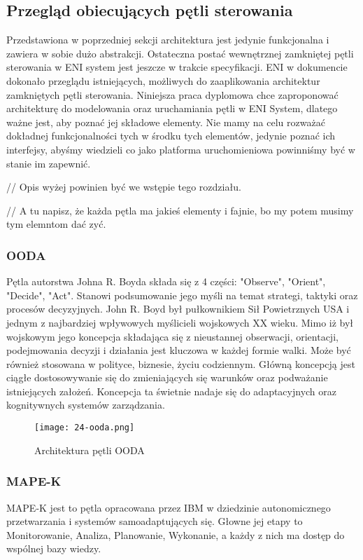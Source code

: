 \subsection{Przegląd obiecujących pętli sterowania}

Przedstawiona w poprzedniej sekcji architektura jest jedynie funkcjonalna i zawiera w sobie dużo abstrakcji. Ostateczna postać wewnętrznej zamkniętej pętli sterowania w ENI system jest jeszcze w trakcie specyfikacji. ENI w dokumencie \cite{enioverview} dokonało przeglądu istniejących, możliwych do zaaplikowania architektur zamkniętych pętli sterowania. Niniejsza praca dyplomowa chce zaproponować architekturę do modelowania oraz uruchamiania pętli w ENI System, dlatego ważne jest, aby poznać jej składowe elementy. Nie mamy na celu rozważać dokładnej funkcjonalności tych w środku tych elementów, jedynie poznać ich interfejsy, abyśmy wiedzieli co jako platforma uruchomieniowa powinniśmy być w stanie im zapewnić. 

// Opis wyżej powinien być we wstępie tego rozdziału.

// A tu napisz, że każda pętla ma jakieś elementy i fajnie, bo my potem musimy tym elemntom dać zyć.

\subsubsection{OODA}
Pętla autorstwa Johna R. Boyda składa się z 4 części: "Observe", "Orient", "Decide", "Act". Stanowi podsumowanie jego myśli na temat strategi, taktyki oraz procesów decyzyjnych. John R. Boyd był pułkownikiem Sił Powietrznych USA i jednym z najbardziej wpływowych myślicieli wojskowych XX wieku. Mimo iż był wojskowym jego koncepcja składająca się z nieustannej obserwacji, orientacji, podejmowania decyzji i działania jest kluczowa w każdej formie walki. Może być również stosowana w polityce, biznesie, życiu codziennym. Główną koncepcją jest ciągłe dostosowywanie się do zmieniających się warunków oraz podważanie istniejących założeń. Koncepcja ta świetnie nadaje się do adaptacyjnych oraz kognitywnych systemów zarządzania.

\begin{figure}[!h]
    \centering \texttt{[image: 24-ooda.png]}
    \caption{Architektura pętli OODA}\label{fig:24-ooda}
\end{figure}


\subsubsection{MAPE-K}
MAPE-K jest to pętla opracowana przez IBM w dziedzinie autonomicznego przetwarzania i systemów samoadaptujących się. Głowne jej etapy to Monitorowanie, Analiza, Planowanie, Wykonanie, a każdy z nich ma dostęp do wspólnej bazy wiedzy. 


